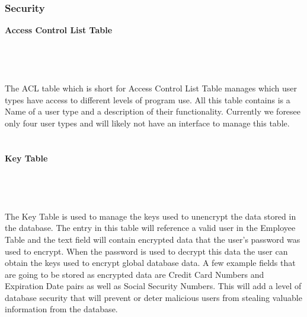 \documentclass{report}
\begin{document}
    \subsubsection{Security}

    {\bf Access Control List Table}\\
    \\
    \\
    \\
    \\
    The ACL table which is short for Access Control List Table manages which user types have access
    to different levels of program use. All this table contains is a Name of a user type and a description
    of their functionality. Currently we foresee only four user types and will likely not have an
    interface to manage this table.\\
    \\
    \\
    {\bf Key Table}\\
    \\
    \\
    \\
    \\
    The Key Table is used to manage the keys used to unencrypt the data stored in the database. The
    entry in this table will reference a valid user in the Employee Table and the text field will
    contain encrypted data that the user's password was used to encrypt. When the password is used
    to decrypt this data the user can obtain the keys used to encrypt global database data. A few
    example fields that are going to be stored as encrypted data are Credit Card Numbers and Expiration
    Date pairs as well as Social Security Numbers. This will add a level of database security that
    will prevent or deter malicious users from stealing valuable information from the database.\\
    \\

    \newpage
\end{document}

